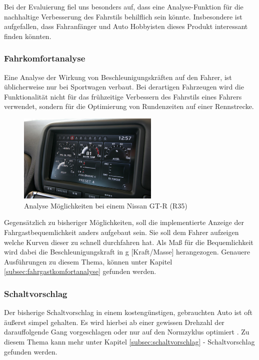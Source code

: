 Bei der Evaluierung fiel uns besonders auf, dass eine Analyse-Funktion für die nachhaltige Verbesserung des Fahrstils behilflich sein könnte. Insbesondere ist aufgefallen, dass Fahranfänger und Auto Hobbyisten dieses Produkt interessant finden könnten.

\subsubsection{Fahrkomfortanalyse}
Eine Analyse der Wirkung von Beschleunigungskräften auf den Fahrer, ist üblicherweise nur bei Sportwagen verbaut. Bei derartigen Fahrzeugen wird die Funktionalität nicht für das frühzeitige Verbessern des Fahrstils eines Fahrers verwendet, sondern für die Optimierung von Rundenzeiten auf einer Rennstrecke.

\begin{figure}\centering
	\includegraphics[width=0.6\textwidth]{images/gtrMultifunc}
	\caption{Analyse Möglichkeiten bei einem Nissan GT-R (R35) \cite{SIMR.CH1-Fahrstil-Analyse.GTRMultifunc}}\label{Fig:imgGTR}
\end{figure}

Gegensätzlich zu bisheriger Möglichkeiten, soll die implementierte Anzeige der Fahrgastbequemlichkeit anders aufgebaut sein.
Sie soll dem Fahrer aufzeigen welche Kurven dieser zu schnell durchfahren hat. Als Maß für die Bequemlichkeit wird dabei die Beschleunigungskraft in g [Kraft/Masse] herangezogen. Genauere Ausführungen zu diesem Thema, können unter Kapitel \ref{subsec:fahrgastkomfortanalyse} gefunden werden.

\subsubsection{Schaltvorschlag}
Der bisherige Schaltvorschlag in einem kostengünstigen, gebrauchten Auto ist oft äußerst simpel gehalten. Es wird hierbei ab einer gewissen Drehzahl der darauffolgende Gang vorgeschlagen oder nur auf den Normzyklus optimiert \cite{SIMR.CH1-Fahrstil-Analyse.Schaltempfehlung}. Zu diesem Thema kann mehr unter Kapitel \ref{subsec:schaltvorschlag} - Schaltvorschlag gefunden werden.
